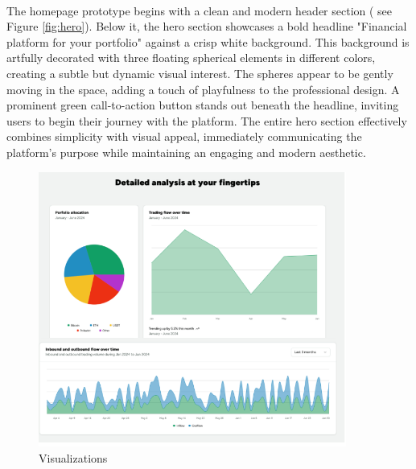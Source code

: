 \paragraph{}The homepage prototype begins with a clean and modern header section ( see Figure \ref{fig:hero}). Below it, the hero section showcases a bold headline "Financial platform for your portfolio" against a crisp white background. This background is artfully decorated with three floating spherical elements in different colors, creating a subtle but dynamic visual interest. The spheres appear to be gently moving in the space, adding a touch of playfulness to the professional design. A prominent green call-to-action button stands out beneath the headline, inviting users to begin their journey with the platform. The entire hero section effectively combines simplicity with visual appeal, immediately communicating the platform's purpose while maintaining an engaging and modern aesthetic.
 \begin{figure}[h]
    \centering
    \includegraphics[width= 0.9\textwidth, 
    height=0.6\textheight, keepaspectratio]{root/analysis.png}
     \caption{Visualizations}
    \label{fig:analysis}
\end{figure}

